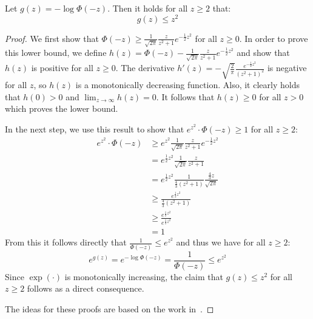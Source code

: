 \begin{lemma}
    Let $g(z) = -\log \Phi(-z)$. Then it holds for all $z \geq 2$ that:
    $$
        g(z) \leq z^2
    $$
\end{lemma}
\begin{proof}
    We first show that $\Phi(-z) \geq \frac{1}{\sqrt{2 \pi}} \frac{z}{z^2 + 1} e^{-\frac{1}{2} z^2}$
    for all $z \geq 0$.
    In order to prove this lower bound, we define
    $h(z) = \Phi(-z) - \frac{1}{\sqrt{2 \pi}} \frac{z}{z^2 + 1} e^{-\frac{1}{2} z^2}$
    and show that $h(z)$ is positive for all $z \geq 0$.
    The derivative $h'(z) = -\sqrt{\frac{2}{\pi}} \frac{e^{-\frac{1}{2} z^2}}{(z^2 + 1)^2}$ is
    negative for all $z$, so $h(z)$ is a monotonically decreasing function.
    Also, it clearly holds that $h(0) > 0$ and
    $\lim_{z \rightarrow \infty} h(z) = 0$. It follows that $h(z) \geq 0$
    for all $z > 0$ which proves the lower bound.

    In the next step, we use this result to show that $e^{z^2} \cdot \Phi(-z) \geq 1$
    for all $z \geq 2$:
    \begin{align*}
        e^{z^2} \cdot \Phi(-z) & \geq e^{z^2} \frac{1}{\sqrt{2 \pi}} \frac{z}{z^2 + 1} e^{-\frac{1}{2} z^2}                           \\
                               & = e^{\frac{1}{2} z^2} \frac{1}{\sqrt{2 \pi}} \frac{z}{z^2 + 1}                                       \\
                               & = e^{\frac{1}{2} z^2} \frac{1}{\frac{4}{3}\left( z^2 + 1 \right)} \frac{\frac{4}{3} z}{\sqrt{2 \pi}} \\
                               & \geq \frac{e^{\frac{1}{2} z^2}}{\frac{4}{3}\left( z^2 + 1 \right)}                                   \\
                               & \geq \frac{e^{\frac{1}{2} z^2}}{e^{\frac{1}{2} z^2}}                                                 \\
                               & = 1
    \end{align*}
    From this it follows directly that $\frac{1}{\Phi(-z)} \leq e^{z^2}$
    and thus we have for all $z \geq 2$:
    $$
        e^{g(z)} = e^{-\log \Phi(-z)} = \frac{1}{\Phi(-z)} \leq e^{z^2}
    $$
    Since $\exp{\left( \cdot \right)}$ is monotonically increasing, the claim
    that $g(z) \leq z^2$ for all $z \geq 2$ follows as a direct consequence.

    The ideas for these proofs are based on the work in~\cite{gaussian_bounds}.
\end{proof}

